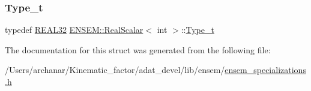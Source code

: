 \subsubsection{\texorpdfstring{Type\_t}{Type\_t}\hspace{0.1cm}{\footnotesize\ttfamily [2/2]}}
{\footnotesize\ttfamily typedef \mbox{\hyperlink{namespaceENSEM_a7540d01191172323e9073283d772576d}{R\+E\+A\+L32}} \mbox{\hyperlink{structENSEM_1_1RealScalar}{E\+N\+S\+E\+M\+::\+Real\+Scalar}}$<$ int $>$\+::\mbox{\hyperlink{structENSEM_1_1RealScalar_3_01int_01_4_af4f2f0e6cc881e70e0564b3fe00b8ff7}{Type\+\_\+t}}}



The documentation for this struct was generated from the following file\+:\begin{DoxyCompactItemize}
\item 
/\+Users/archanar/\+Kinematic\+\_\+factor/adat\+\_\+devel/lib/ensem/\mbox{\hyperlink{lib_2ensem_2ensem__specializations_8h}{ensem\+\_\+specializations.\+h}}\end{DoxyCompactItemize}
